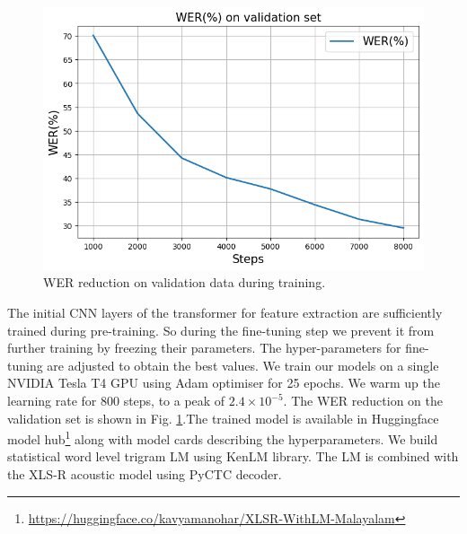 \documentclass[runningheads]{llncs}
\begin{document}





\begin{figure}[htpb]
    \centering
    \includegraphics[width=0.8\linewidth, height=0.5\linewidth]{wer-curve.png}
    \caption{WER reduction on validation data during training.}
    \label{Fig:WER}

\end{figure}

The initial CNN layers of the transformer for feature extraction are sufficiently trained during pre-training. So during the fine-tuning step we prevent it from further training by freezing their parameters. The hyper-parameters  for fine-tuning are adjusted to obtain the best values. We train our models on a single NVIDIA Tesla T4 GPU using Adam optimiser for 25 epochs. We warm up the learning rate for 800 steps, to a peak of $2.4 \times 10^{−5}$. The WER reduction on the validation set is shown in Fig. \ref{Fig:WER}.The trained model is available in Huggingface model hub\footnote{\url{https://huggingface.co/kavyamanohar/XLSR-WithLM-Malayalam}} along with model cards describing the hyperparameters. We build statistical word level trigram LM using KenLM \cite{heafield2011kenlm} library. The LM is combined with the XLS-R acoustic model using PyCTC decoder.
\end{document}
